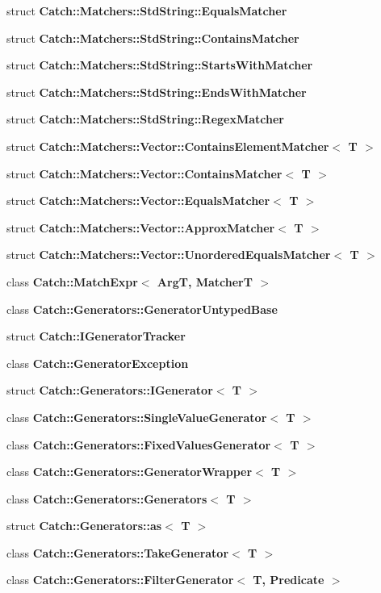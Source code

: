 \begin{DoxyCompactItemize}
\item 
struct \textbf{ Catch\+::\+Matchers\+::\+Std\+String\+::\+Equals\+Matcher}
\item 
struct \textbf{ Catch\+::\+Matchers\+::\+Std\+String\+::\+Contains\+Matcher}
\item 
struct \textbf{ Catch\+::\+Matchers\+::\+Std\+String\+::\+Starts\+With\+Matcher}
\item 
struct \textbf{ Catch\+::\+Matchers\+::\+Std\+String\+::\+Ends\+With\+Matcher}
\item 
struct \textbf{ Catch\+::\+Matchers\+::\+Std\+String\+::\+Regex\+Matcher}
\item 
struct \textbf{ Catch\+::\+Matchers\+::\+Vector\+::\+Contains\+Element\+Matcher$<$ T $>$}
\item 
struct \textbf{ Catch\+::\+Matchers\+::\+Vector\+::\+Contains\+Matcher$<$ T $>$}
\item 
struct \textbf{ Catch\+::\+Matchers\+::\+Vector\+::\+Equals\+Matcher$<$ T $>$}
\item 
struct \textbf{ Catch\+::\+Matchers\+::\+Vector\+::\+Approx\+Matcher$<$ T $>$}
\item 
struct \textbf{ Catch\+::\+Matchers\+::\+Vector\+::\+Unordered\+Equals\+Matcher$<$ T $>$}
\item 
class \textbf{ Catch\+::\+Match\+Expr$<$ Arg\+T, Matcher\+T $>$}
\item 
class \textbf{ Catch\+::\+Generators\+::\+Generator\+Untyped\+Base}
\item 
struct \textbf{ Catch\+::\+I\+Generator\+Tracker}
\item 
class \textbf{ Catch\+::\+Generator\+Exception}
\item 
struct \textbf{ Catch\+::\+Generators\+::\+I\+Generator$<$ T $>$}
\item 
class \textbf{ Catch\+::\+Generators\+::\+Single\+Value\+Generator$<$ T $>$}
\item 
class \textbf{ Catch\+::\+Generators\+::\+Fixed\+Values\+Generator$<$ T $>$}
\item 
class \textbf{ Catch\+::\+Generators\+::\+Generator\+Wrapper$<$ T $>$}
\item 
class \textbf{ Catch\+::\+Generators\+::\+Generators$<$ T $>$}
\item 
struct \textbf{ Catch\+::\+Generators\+::as$<$ T $>$}
\item 
class \textbf{ Catch\+::\+Generators\+::\+Take\+Generator$<$ T $>$}
\item 
class \textbf{ Catch\+::\+Generators\+::\+Filter\+Generator$<$ T, Predicate $>$}

\end{DoxyCompactItemize}
